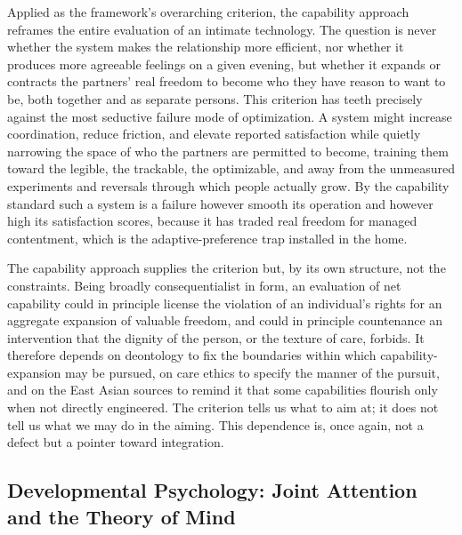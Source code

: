 \documentclass[11pt,a4paper]{article}
\begin{document}
Applied as the framework's overarching criterion, the capability approach reframes the entire evaluation of an intimate technology. The question is never whether the system makes the relationship more efficient, nor whether it produces more agreeable feelings on a given evening, but whether it expands or contracts the partners' real freedom to become who they have reason to want to be, both together and as separate persons. This criterion has teeth precisely against the most seductive failure mode of optimization. A system might increase coordination, reduce friction, and elevate reported satisfaction while quietly narrowing the space of who the partners are permitted to become, training them toward the legible, the trackable, the optimizable, and away from the unmeasured experiments and reversals through which people actually grow. By the capability standard such a system is a failure however smooth its operation and however high its satisfaction scores, because it has traded real freedom for managed contentment, which is the adaptive-preference trap installed in the home.

The capability approach supplies the criterion but, by its own structure, not the constraints. Being broadly consequentialist in form, an evaluation of net capability could in principle license the violation of an individual's rights for an aggregate expansion of valuable freedom, and could in principle countenance an intervention that the dignity of the person, or the texture of care, forbids. It therefore depends on deontology to fix the boundaries within which capability-expansion may be pursued, on care ethics to specify the manner of the pursuit, and on the East Asian sources to remind it that some capabilities flourish only when not directly engineered. The criterion tells us what to aim at; it does not tell us what we may do in the aiming. This dependence is, once again, not a defect but a pointer toward integration.

\subsection{Developmental Psychology: Joint Attention and the Theory of Mind}\label{p01:sec:devpsych}
\end{document}
